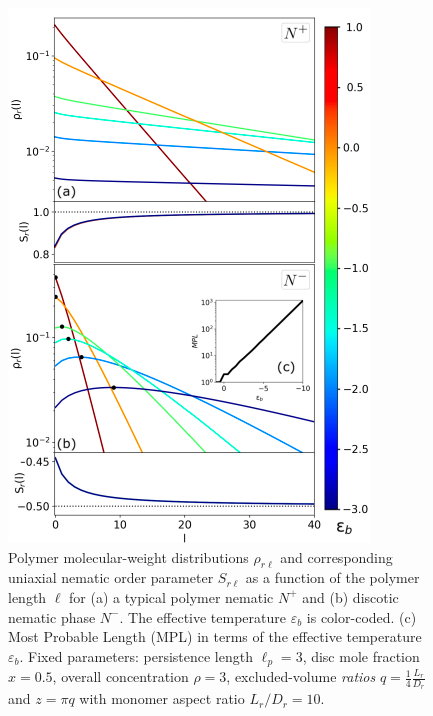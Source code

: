 \begin{figure}
  \includegraphics[width=\linewidth]{figures/chapter-2/FIG2}
  \caption{Polymer molecular-weight distributions $\rho_{r \ell}$ and corresponding  uniaxial nematic order parameter $S_{r \ell}$ as a function of the polymer length $\ell$ for (a) a typical polymer nematic $N^{+}$ and (b) discotic nematic phase $N^{-}$. The effective temperature $\varepsilon_{b}$ is color-coded.   
  (c) Most Probable Length (MPL) in terms of the effective temperature $\varepsilon_{b}$. Fixed parameters: persistence length $\ell_{p} = 3$, disc mole fraction $x = 0.5$, overall concentration $\rho = 3$, excluded-volume {\em ratios} $q = \frac{1}{4}\frac{L_{r}}{D_{r}}$ and $z=\pi q$ with monomer aspect ratio $L_{r}/D_{r} =10$.  }
  \label{fig:distributions}
\end{figure}
 
